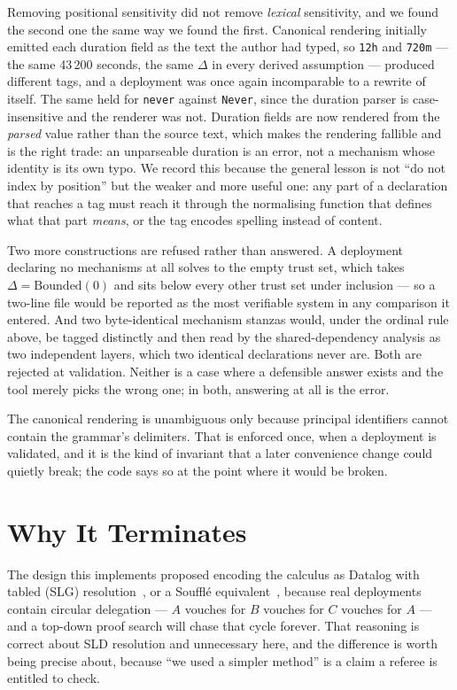 \documentclass[11pt]{article}
\begin{document}
Removing positional sensitivity did not remove \emph{lexical} sensitivity,
and we found the second one the same way we found the first. Canonical
rendering initially emitted each duration field as the text the author had
typed, so \texttt{12h} and \texttt{720m} --- the same 43\,200 seconds, the
same $\Delta$ in every derived assumption --- produced different tags, and a
deployment was once again incomparable to a rewrite of itself. The same held
for \texttt{never} against \texttt{Never}, since the duration parser is
case-insensitive and the renderer was not. Duration fields are now rendered
from the \emph{parsed} value rather than the source text, which makes the
rendering fallible and is the right trade: an unparseable duration is an
error, not a mechanism whose identity is its own typo. We record this
because the general lesson is not ``do not index by position'' but the
weaker and more useful one: any part of a declaration that reaches a tag
must reach it through the normalising function that defines what that part
\emph{means}, or the tag encodes spelling instead of content.

Two more constructions are refused rather than answered. A deployment
declaring no mechanisms at all solves to the empty
trust set, which takes $\Delta = \mathrm{Bounded}(0)$ and sits below every
other trust set under inclusion --- so a two-line file would be reported as
the most verifiable system in any comparison it entered. And two
byte-identical mechanism stanzas would, under the ordinal rule above, be
tagged distinctly and then read by the shared-dependency analysis as two
independent layers, which two identical declarations never are. Both are
rejected at validation. Neither is a case where a defensible answer exists
and the tool merely picks the wrong one; in both, answering at all is the
error.

The canonical rendering is unambiguous only because principal identifiers
cannot contain the grammar's delimiters. That is enforced once, when a
deployment is validated, and it is the kind of invariant that a later
convenience change could quietly break; the code says so at the point where
it would be broken.

\section{Why It Terminates}
\label{sec:termination}

The design this implements proposed encoding the calculus as Datalog with
tabled (SLG) resolution~\cite{slg,xsb}, or a Souffl\'{e}
equivalent~\cite{souffle}, because real deployments contain
circular delegation --- $A$ vouches for $B$ vouches for $C$ vouches for $A$
--- and a top-down proof search will chase that cycle forever. That reasoning
is correct about SLD resolution and unnecessary here, and the difference is
worth being precise about, because ``we used a simpler method'' is a claim a
referee is entitled to check.
\end{document}
